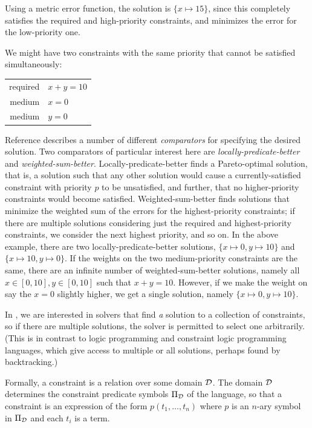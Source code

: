 Using a metric error function, the solution is $\{x \mapsto 15\}$,
since this completely satisfies the required and high-priority
constraints, and minimizes the error for the low-priority one.

We might have two constraints with the same priority that cannot be
satisfied simultaneously:

\begin{center}
\begin{tabular}{rl}
required &     $x+y=10$ \\
medium   &     $x=0$ \\
medium   &     $y=0$
\end{tabular}
\end{center}

Reference \cite{borning-lisp-symbolic-computation-1992} describes a
number of different \emph{comparators} for specifying the desired
solution.  Two comparators of particular interest here are
\emph{locally-predicate-better} and \emph{weighted-sum-better}.
Locally-predicate-better finds a Pareto-optimal solution, that is, a
solution such that any other solution would cause a
currently-satisfied constraint with priority $p$ to be unsatisfied,
and further, that no higher-priority constraints would become
satisfied.  Weighted-sum-better finds solutions that minimize the
weighted sum of the errors for the highest-priority constraints; if
there are multiple solutions considering just the required and
highest-priority constraints, we consider the next highest priority,
and so on.  In the above example, there are two
locally-predicate-better solutions, $\{x \mapsto 0, y \mapsto 10\}$
and $\{x \mapsto 10, y \mapsto 0\}$.  If the weights on the two
medium-priority constraints are the same, there are an infinite number
of weighted-sum-better solutions, namely all $x \in [0,10], y \in
[0,10]$ such that $x+y=10$.  However, if we make the weight on say the
$x=0$ slightly higher, we get a single solution, namely $\{x \mapsto
0, y \mapsto 10\}$.

In \langname, we are interested in solvers that find \emph{a} solution
to a collection of constraints, so if there are multiple solutions,
the solver is permitted to select one arbitrarily.  (This is in
contrast to logic programming and constraint logic programming
languages, which give access to multiple or all solutions, perhaps
found by backtracking.)

Formally, a constraint is a relation over some domain $\cal D$\@.  The
domain $\cal D$ determines the constraint predicate symbols $\Pi_{\cal
  D}$ of the language, so that a constraint is an expression of the
form $p(t_{1} , \ldots , t_{n} )$ where $p$ is an $n$-ary symbol in
$\Pi_{\cal D}$ and each $t_{i}$ is a term.

